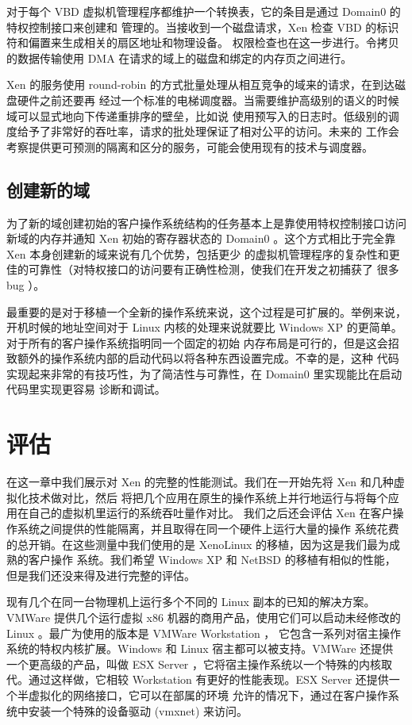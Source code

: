 对于每个 VBD 虚拟机管理程序都维护一个转换表，它的条目是通过 Domain0 的特权控制接口来创建和
管理的。当接收到一个磁盘请求，Xen 检查 VBD 的标识符和偏置来生成相关的扇区地址和物理设备。
权限检查也在这一步进行。令拷贝的数据传输使用 DMA 在请求的域上的磁盘和绑定的内存页之间进行。

Xen 的服务使用 round-robin 的方式批量处理从相互竞争的域来的请求，在到达磁盘硬件之前还要再
经过一个标准的电梯调度器。当需要维护高级别的语义的时候域可以显式地向下传递重排序的壁垒，比如说
使用预写入的日志时。低级别的调度给予了非常好的吞吐率，请求的批处理保证了相对公平的访问。未来的
工作会考察提供更可预测的隔离和区分的服务，可能会使用现有的技术与调度器。

\subsection{创建新的域}

为了新的域创建初始的客户操作系统结构的任务基本上是靠使用特权控制接口访问新域的内存并通知 Xen
初始的寄存器状态的 Domain0 。这个方式相比于完全靠 Xen 本身创建新的域来说有几个优势，包括更少
的虚拟机管理程序的复杂性和更佳的可靠性（对特权接口的访问要有正确性检测，使我们在开发之初捕获了
很多 bug ）。

最重要的是对于移植一个全新的操作系统来说，这个过程是可扩展的。举例来说，开机时候的地址空间对于
Linux 内核的处理来说就要比 Windows XP 的更简单。对于所有的客户操作系统指明同一个固定的初始
内存布局是可行的，但是这会招致额外的操作系统内部的启动代码以将各种东西设置完成。不幸的是，这种
代码实现起来非常的有技巧性，为了简洁性与可靠性，在 Domain0 里实现能比在启动代码里实现更容易
诊断和调试。

\section{评估}

在这一章中我们展示对 Xen 的完整的性能测试。我们在一开始先将 Xen 和几种虚拟化技术做对比，然后
将把几个应用在原生的操作系统上并行地运行与将每个应用在自己的虚拟机里运行的系统吞吐量作对比。
我们之后还会评估 Xen 在客户操作系统之间提供的性能隔离，并且取得在同一个硬件上运行大量的操作
系统花费的总开销。在这些测量中我们使用的是 XenoLinux 的移植，因为这是我们最为成熟的客户操作
系统。我们希望 Windows XP 和 NetBSD 的移植有相似的性能，但是我们还没来得及进行完整的评估。

现有几个在同一台物理机上运行多个不同的 Linux 副本的已知的解决方案。VMWare 提供几个运行虚拟
x86 机器的商用产品，使用它们可以启动未经修改的 Linux 。最广为使用的版本是 VMWare Workstation ，
它包含一系列对宿主操作系统的特权内核扩展。Windows 和 Linux 宿主都可以被支持。VMWare 还提供
一个更高级的产品，叫做 ESX Server ，它将宿主操作系统以一个特殊的内核取代。通过这样做，它相较
Workstation 有更好的性能表现。ESX Server 还提供一个半虚拟化的网络接口，它可以在部属的环境
允许的情况下，通过在客户操作系统中安装一个特殊的设备驱动 (vmxnet) 来访问。

